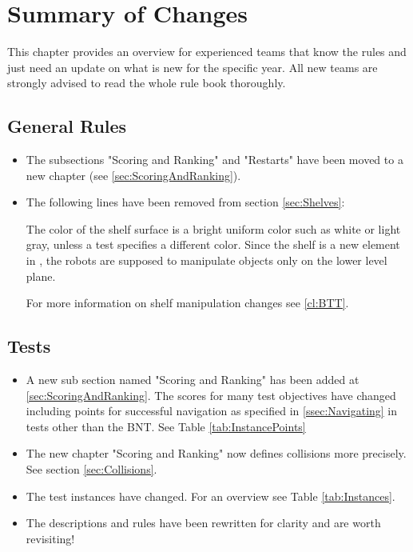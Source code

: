 
\chapter{Summary of Changes}

This chapter provides an overview for experienced teams that know the rules and just need an update on what is new for the specific year. All new teams are strongly advised to read the whole rule book thoroughly.

\section{General Rules}
\begin{itemize}
  \item The subsections "Scoring and Ranking" and "Restarts" have been moved to a new chapter (see \ref{sec:ScoringAndRanking}).
  \item The following lines have been removed from section \ref{sec:Shelves}:\par
  The color of the shelf surface is a bright uniform color such as white or light gray, unless a test specifies a different color.
Since the shelf is a new element in \RCAW, the robots are supposed to manipulate objects only on the lower level plane.\par
For more information on shelf manipulation changes see \ref{cl:BTT}.
\end{itemize}

\section{Tests}
\begin{itemize}
  \item A new sub section named "Scoring and Ranking" has been added at \ref{sec:ScoringAndRanking}. The scores for many test objectives have changed including points for successful navigation as specified in \ref{ssec:Navigating} in tests other than the BNT. See Table \ref{tab:InstancePoints}
  \item The new chapter "Scoring and Ranking" now defines collisions more precisely. See section \ref{sec:Collisions}.
  \item The test instances have changed. For an overview see Table \ref{tab:Instances}.
  \item The descriptions and rules have been rewritten for clarity and are worth revisiting!
\end{itemize}

